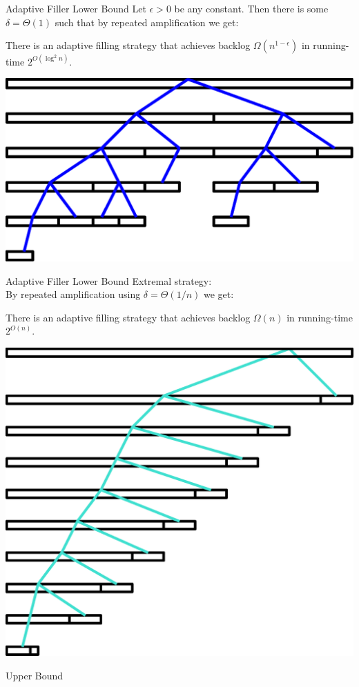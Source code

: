 \documentclass[xcolor=x11names, svgnames, rgb]{beamer}
\begin{document}
\begin{frame}[t]{Adaptive Filler Lower Bound}
  Let $\epsilon > 0$ be any constant. Then there is some $\delta=\Theta(1)$ such that by repeated amplification we get: 
  \begin{theorem}
    There is an adaptive filling strategy that achieves
    backlog $\Omega(n^{1-\epsilon})$  in running-time $2^{O(\log^2 n)}$.
  \end{theorem}
  \vspace{0.5cm}
  \includegraphics[width=0.7\linewidth]{amplificationImgs/quasipoly_cor.eps}
\end{frame}

\begin{frame}[t]{Adaptive Filler Lower Bound}
  Extremal strategy:\\
  By repeated amplification using $\delta=\Theta(1/n)$ we get: 
  \begin{theorem}
    There is an adaptive filling strategy that achieves backlog $\Omega(n)$ in running-time $2^{O(n)}$.
  \end{theorem}
  \vspace{0.5cm}
  \includegraphics[width=0.45\linewidth]{amplificationImgs/expo_cor.eps}
\end{frame}

\begin{frame}[c]{}
  \begin{center}
    \Huge Upper Bound 
  \end{center}
\end{frame}
\end{document}
